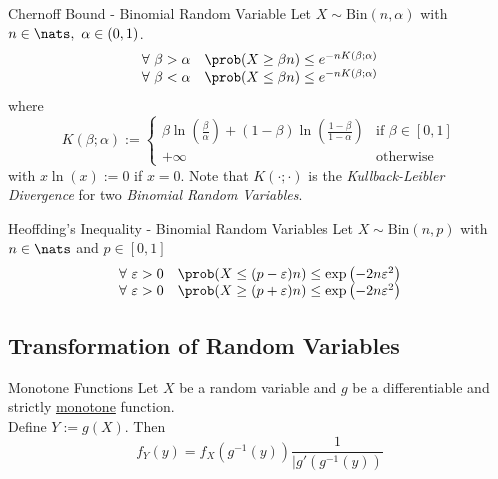 \documentclass[11pt,a4paper]{article}
\begin{document}
\begin{theorem}{Chernoff Bound - Binomial Random Variable}
  Let $X\sim\text{Bin}(n,\alpha)$ with $n\in\nats,\ \alpha\in(0,1)$.
  \[\begin{array}{rl}
    \forall\ \beta>\alpha&\prob(X\geq\beta n)\leq e^{-nK(\beta;\alpha)}\\
    \forall\ \beta<\alpha&\prob(X\leq\beta n)\leq e^{-nK(\beta;\alpha)}
  \end{array}\]
  where
  \[ K(\beta;\alpha):=\begin{cases}\beta\ln\left(\frac\beta\alpha\right)+(1-\beta)\ln\left(\frac{1-\beta}{1-\alpha}\right)&\text{if }\beta\in[0,1]\\+\infty&\text{otherwise}\end{cases} \]
  with $x\ln(x):=0$ if $x=0$. Note that $K(\cdot;\cdot)$ is the \textit{Kullback-Leibler Divergence} for two \textit{Binomial Random Variables}.
\end{theorem}

\begin{theorem}{Heoffding's Inequality - Binomial Random Variables}
  Let $X\sim\text{Bin}(n,p)$ with $n\in\nats$ and $p\in[0,1]$
  \[\begin{array}{rl}
    \forall\ \varepsilon>0&\prob(X\leq(p-\varepsilon)n)\leq\exp\left(-2n\varepsilon^2\right)\\
    \forall\ \varepsilon>0&\prob(X\geq(p+\varepsilon)n)\leq\exp\left(-2n\varepsilon^2\right)
  \end{array}\]
\end{theorem}

\subsection{Transformation of Random Variables}



\begin{theorem}{Monotone Functions}
  Let $X$ be a random variable and $g$ be a differentiable and strictly \underline{monotone} function.\\
  Define $Y:=g(X)$. Then
  \[ f_Y(y)=f_X(g^{-1}(y))\frac{1}{|g'(g^{-1}(y))} \]
\end{theorem}
\end{document}
